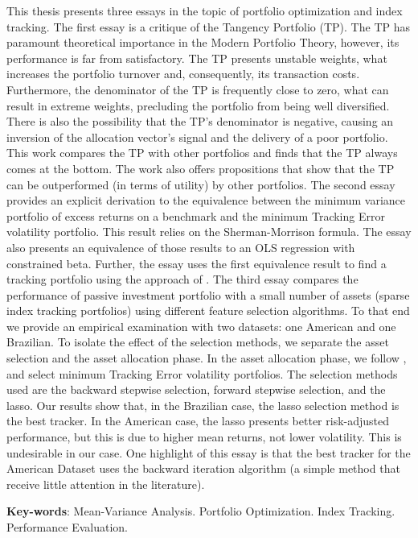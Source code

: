 \documentclass[12pt,oneside,a4paper]{memoir}
\begin{document}
\noindent
This thesis presents three essays in the topic of portfolio optimization and index tracking.
The first essay is a critique of the Tangency Portfolio (TP).
The TP has paramount theoretical importance in the Modern Portfolio Theory, however, its performance is far from satisfactory.
The TP presents unstable weights, what increases the portfolio turnover and, consequently, its transaction costs.
Furthermore, the denominator of the TP is frequently close to zero, what can result in extreme weights, precluding the portfolio from being well diversified.
There is also the possibility that the TP's denominator is negative, causing an inversion of the allocation vector's signal and the delivery of a poor portfolio.
This work compares the TP with other portfolios and finds that the TP always comes at the bottom.
The work also offers propositions that show that the TP can be outperformed (in terms of utility) by other portfolios.
The second essay provides an explicit derivation to the equivalence between the minimum variance portfolio of excess returns on a benchmark and the minimum Tracking Error volatility portfolio.
This result relies on the Sherman-Morrison formula.
The essay also presents an equivalence of those results to an OLS regression with constrained beta.
Further, the essay uses the first equivalence result to find a tracking portfolio using the approach of .
The third essay compares the performance of passive investment portfolio with a small number of assets (sparse index tracking portfolios) using different feature selection algorithms.
To that end we provide an empirical examination with two datasets: one American and one Brazilian.
To isolate the effect of the selection methods, we separate the asset selection and the asset allocation phase.
In the asset allocation phase, we follow , and select minimum Tracking Error volatility portfolios.
The selection methods used are the backward stepwise selection, forward stepwise selection, and the lasso.
Our results show that, in the Brazilian case, the lasso selection method is the best tracker.
In the American case, the lasso presents better risk-adjusted performance, but this is due to higher mean returns, not lower volatility.
This is undesirable in our case.
One highlight of this essay is that the best tracker for the American Dataset uses the backward iteration algorithm (a simple method that receive little attention in the literature).

\noindent
\textbf{Key-words}: Mean-Variance Analysis. Portfolio Optimization. Index Tracking. Performance Evaluation.
\end{document}
